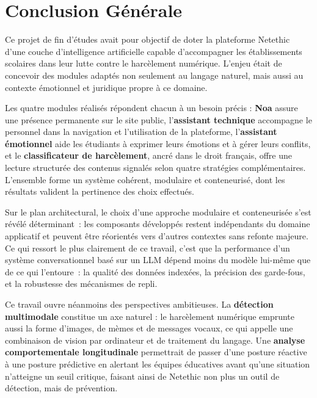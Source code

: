 \chapter*{Conclusion Générale}

Ce projet de fin d'études avait pour objectif de doter la plateforme Netethic d'une couche
d'intelligence artificielle capable d'accompagner les établissements scolaires dans leur lutte
contre le harcèlement numérique. L'enjeu était de concevoir des modules adaptés non seulement
au langage naturel, mais aussi au contexte émotionnel et juridique propre à ce domaine.

Les quatre modules réalisés répondent chacun à un besoin précis : \textbf{Noa} assure une présence
permanente sur le site public, l'\textbf{assistant technique} accompagne le personnel dans la navigation et l'utilisation
de la plateforme, l'\textbf{assistant émotionnel} aide les étudiants à exprimer leurs émotions et à gérer leurs conflits,
et le \textbf{classificateur de harcèlement},
ancré dans le droit français, offre une lecture structurée des contenus signalés selon quatre
stratégies complémentaires. L'ensemble forme un système cohérent, modulaire et conteneurisé,
dont les résultats valident la pertinence des choix effectués.

Sur le plan architectural, le choix d'une approche modulaire et conteneurisée
s'est révélé déterminant~: les composants développés restent indépendants du domaine
applicatif et peuvent être réorientés vers d'autres contextes sans refonte majeure.
Ce qui ressort le plus clairement de ce travail, c'est que la performance d'un système
conversationnel basé sur un LLM dépend moins du modèle lui-même que de ce qui l'entoure~:
la qualité des données indexées, la précision des garde-fous, et la robustesse
des mécanismes de repli.

\medskip

Ce travail ouvre néanmoins des perspectives ambitieuses. La \textbf{détection multimodale}
constitue un axe naturel : le harcèlement numérique emprunte aussi la forme d'images, de mèmes
et de messages vocaux, ce qui appelle une combinaison de vision par ordinateur et de traitement
du langage. Une \textbf{analyse comportementale longitudinale} permettrait de passer d'une posture réactive à
une posture prédictive en alertant les équipes éducatives avant qu'une situation n'atteigne un
seuil critique, faisant ainsi de Netethic non plus un outil de détection, mais de prévention.

